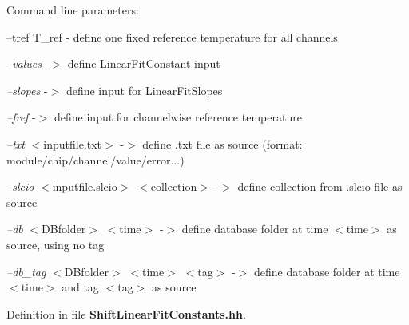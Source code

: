 Command line parameters\-: \begin{DoxyVerb}\e --tref \<T_ref\> -\> define one fixed reference temperature for all channels \n
\end{DoxyVerb}
 \par
 {\itshape --values} -\/$>$ define Linear\-Fit\-Constant input\par
 {\itshape --slopes} -\/$>$ define input for Linear\-Fit\-Slopes\par
 {\itshape --fref} -\/$>$ define input for channelwise reference temperature \par
\par
 {\itshape --txt} $<$inputfile.\-txt$>$ -\/$>$ define .txt file as source (format\-: module/chip/channel/value/error...)\par
 {\itshape --slcio} $<$inputfile.\-slcio$>$ $<$collection$>$ -\/$>$ define collection from .slcio file as source\par
 {\itshape --db} $<$D\-Bfolder$>$ $<$time$>$ -\/$>$ define database folder at time $<$time$>$ as source, using no tag\par
 {\itshape --db\-\_\-tag} $<$D\-Bfolder$>$ $<$time$>$ $<$tag$>$ -\/$>$ define database folder at time $<$time$>$ and tag $<$tag$>$ as source\par


Definition in file {\bf Shift\-Linear\-Fit\-Constants.\-hh}.

